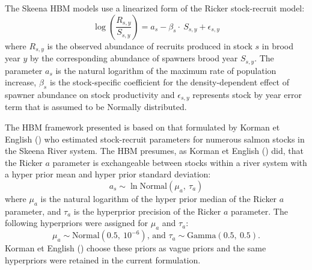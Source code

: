 \documentclass[french,11pt]{book}
\begin{document}
\label{app:HBMFits-1}

The Skeena HBM models use a linearized form of the Ricker stock-recruit model:
\begin{equation}
\log{\left(\frac{R_{s,y}}{S_{s,y}}\right)=a_s-}\beta_s\cdot\ S_{s,y}+\epsilon_{s,y}
\label{eq:HBMLinRick}
\end{equation}
where \(R_{s,y}\) is the observed abundance of recruits produced in stock \(s\) in brood year \(y\) by the corresponding abundance of spawners brood year \(S_{s,y}\). The parameter \(a_s\) is the natural logarithm of the maximum rate of population increase, \(\beta_s\) is the stock-specific coefficient for the density-dependent effect of spawner abundance on stock productivity and \(\epsilon_{s,y}\) represents stock by year error term that is assumed to be Normally distributed.

The HBM framework presented is based on that formulated by Korman et English () who estimated stock-recruit parameters for numerous salmon stocks in the Skeena River system. The HBM presumes, as Korman et English () did, that the Ricker \(a\) parameter is exchangeable between stocks within a river system with a hyper prior mean and hyper prior standard deviation:
\begin{equation}
  a_s \sim  \ln \textrm{Normal}\left(\mu_a,\ \tau_a\right) 
\end{equation}
where \(\mu_a\) is the natural logarithm of the hyper prior median of the Ricker \(a\) parameter, and \(\tau_a\) is the hyperprior precision of the Ricker \(a\) parameter. The following hyperpriors were assigned for \(\mu_a\) and \(\tau_a\):
\begin{equation}
  \mu_a \sim \textrm{Normal}\left({0.5,\ 10^{-6}}\right)
  \textrm{, and }
  \tau_a \sim  \textrm{Gamma} \left(0.5,\ 0.5 \right).
\end{equation}
Korman et English () choose these priors as vague priors and the same hyperpriors were retained in the current formulation.
\end{document}
